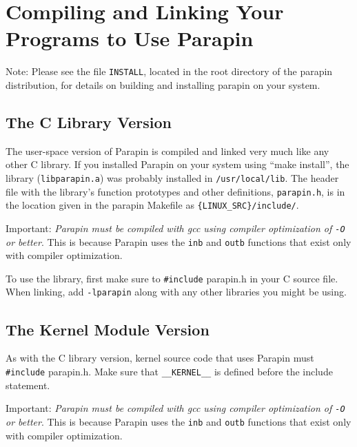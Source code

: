 \documentclass{article}
\begin{document}
\section{Compiling and Linking Your Programs to Use Parapin}
\label{compiling}

Note: Please see the file {\tt INSTALL}, located in the root directory
of the parapin distribution, for details on building and installing
parapin on your system.

\subsection{The C Library Version}

The user-space version of Parapin is compiled and linked very much
like any other C library.  If you installed Parapin on your system
using ``make install'', the library ({\tt libparapin.a}) was probably
installed in {\tt /usr/local/lib}.  The header file with the library's
function prototypes and other definitions, {\tt parapin.h}, is
in the location given in the parapin Makefile as
{\tt \{LINUX\_SRC\}/include/}.

Important: {\em Parapin must be compiled with gcc using compiler
optimization of {\tt -O} or better}.  This is because Parapin uses the
{\tt inb} and {\tt outb} functions that exist only with compiler
optimization.

To use the library, first make sure to {\tt \#include} parapin.h in
your C source file.  When linking, add {\tt -lparapin} along with any
other libraries you might be using.


\subsection{The Kernel Module Version}

As with the C library version, kernel source code that uses Parapin
must {\tt \#include} parapin.h.  Make sure that \verb|__KERNEL__| is
defined before the include statement.

Important: {\em Parapin must be compiled with gcc using compiler
optimization of {\tt -O} or better}.  This is because Parapin uses the
{\tt inb} and {\tt outb} functions that exist only with compiler
optimization.
\end{document}
